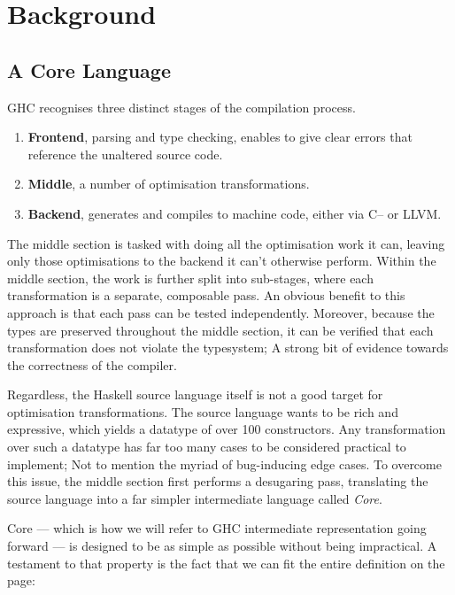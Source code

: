 \chapter{Background}

\section{A Core Language}

GHC recognises three distinct stages of the compilation process. \cite{haskell_optimisations_1997}

\begin{enumerate}
  \item \textbf{Frontend}, parsing and type checking, enables to give clear errors that reference the unaltered source code.
  \item \textbf{Middle}, a number of optimisation transformations.
  \item \textbf{Backend}, generates and compiles to machine code, either via C-- or LLVM.
\end{enumerate}

The middle section is tasked with doing all the optimisation work it can, leaving only those optimisations to the backend
it can't otherwise perform. Within the middle section, the work is further split into sub-stages, where each transformation
is a separate, composable pass. An obvious benefit to this approach is that each pass can be tested independently. Moreover, because
the types are preserved throughout the middle section, it can be verified that each transformation does not violate the typesystem;
A strong bit of evidence towards the correctness of the compiler.

Regardless, the Haskell source language itself is not a good target for optimisation transformations. The source language wants
to be rich and expressive, which yields a datatype of over 100 constructors. Any transformation over such a datatype has far too
many cases to be considered practical to implement; Not to mention the myriad of bug-inducing edge cases. To overcome this issue, the
middle section first performs a desugaring pass, translating the source language into a far simpler intermediate language
called \textit{Core}. 

Core --- which is how we will refer to GHC intermediate representation going forward --- is designed to be as simple as possible
without being impractical. A testament to that property is the fact that we can fit the entire definition on the page:

